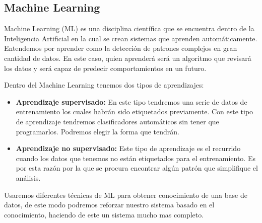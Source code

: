 \subsection{Machine Learning}
Machine Learning (ML) es una disciplina científica que se encuentra dentro de la Inteligencia
 Artificial en la cual se crean sistemas que aprenden automáticamente. Entendemos por aprender
 como la detección de patrones complejos en gran cantidad de datos. En este caso, quien aprenderá
 será un algoritmo que revisará los datos y será capaz de predecir comportamientos en un futuro.

Dentro del Machine Learning tenemos dos tipos de aprendizajes:

\begin{itemize}
  \item \textbf{Aprendizaje supervisado:} En este tipo tendremos una serie de datos de entrenamiento
    los cuales habrán sido etiquetados previamente. Con este tipo de aprendizaje tendremos clasificadores
    automáticos sin tener que programarlos. Podremos elegir la forma que tendrán.
  \item \textbf{Aprendizaje no supervisado:} Este tipo de aprendizaje es el recurrido cuando
    los datos que tenemos no están etiquetados para el entrenamiento. Es por esta razón por la que
    se procura encontrar algún patrón que simplifique el análisis.
\end{itemize}

Usaremos diferentes técnicas de ML para obtener conocimiento de una base de datos, de este modo
podremos reforzar nuestro sistema basado en el conocimiento, haciendo de este un sistema mucho mas
completo.
